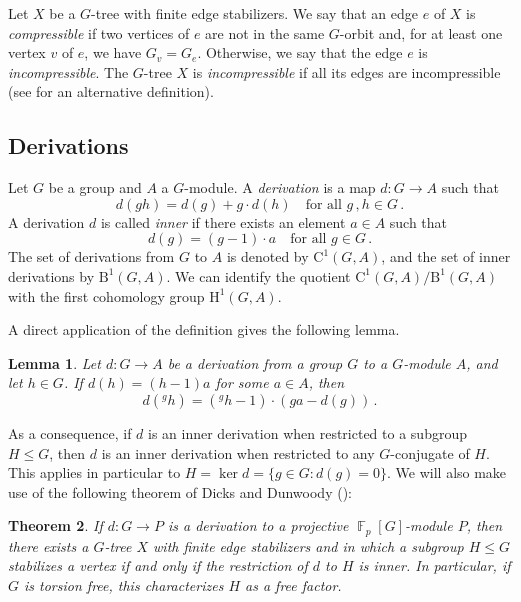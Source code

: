 \documentclass[a4paper]{amsart}
\newtheorem{lem}{Lemma}[section]
\newtheorem{teo}[lem]{Theorem}
\theoremstyle{definition}
\theoremstyle{remark}
\DeclareMathOperator{\bbf}{\mathbb{F}}
\newcommand{\Falgebra}[1]{\bbf_p[#1]}
\newcommand{\HH}{\mathrm{H}}
\begin{document}
Let \(X\) be a \(G\)-tree with finite edge stabilizers. We say that an edge \(e\) of \(X\) is \emph{compressible} if two vertices of \(e\) are not in the same \(G\)-orbit and, for at least one vertex \(v\) of \(e\), we have \(G_v = G_e\). Otherwise, we say that the edge \(e\) is \emph{incompressible}. The \(G\)-tree \(X\) is \emph{incompressible} if all its edges are incompressible (see \cite[Lem. III.7.2]{dicksGroupsActingGraphs1989} for an alternative definition).

\subsection{Derivations}

Let \(G\) be a group and \(A\) a \(G\)-module. A \emph{derivation} is a map \(d\colon G \to A\) such that \[d(gh) = d(g) + g\cdot d(h)\quad\text{for all }g\,, h \in G\,.\] A derivation \(d\) is called \emph{inner} if there exists an element \(a \in A\) such that \[d(g) = (g-1)\cdot a\quad\text{for all }g \in G\,.\] The set of derivations from \(G\) to \(A\) is denoted by \(\mathrm{C}^1(G,A)\), and the set of inner derivations by \(\mathrm{B}^1(G,A)\). We can identify the quotient \(\mathrm{C}^1(G,A)/\mathrm{B}^1(G,A)\) with the first cohomology group \(\HH^1(G,A)\).

A direct application of the definition gives the following lemma.

\begin{lem}\label{claim-conjugate-derivations} Let \(d\colon G \to A\) be a derivation from a group \(G\) to a \(G\)-module \(A\), and let \(h \in G\). If \(d(h) = (h-1)a\) for some \(a \in A\), then \[d({^g h}) = ({^gh}-1)\cdot (ga-d(g))\,.\]
\end{lem}

As a consequence, if \(d\) is an inner derivation when restricted to a subgroup \(H \leq G\), then \(d\) is an inner derivation when restricted to any \(G\)-conjugate of \(H\). This applies in particular to \(H = \ker d = \{g \in G\colon d(g) = 0\}\). We will also make use of the following theorem of Dicks and Dunwoody (\cite[Cor. IV.2.8 and Rem. IV.2.9]{dicksGroupsActingGraphs1989}):

\begin{teo}\label{DD} If \(d\colon G \to P\) is a derivation to a projective \(\Falgebra{G}\)-module \(P\), then there exists a \(G\)-tree \(X\) with finite edge stabilizers and in which a subgroup \(H \leq G\) stabilizes a vertex if and only if the restriction of \(d\) to \(H\) is inner. In particular, if \(G\) is torsion free, this characterizes \(H\) as a free factor.
\end{teo}
\end{document}
